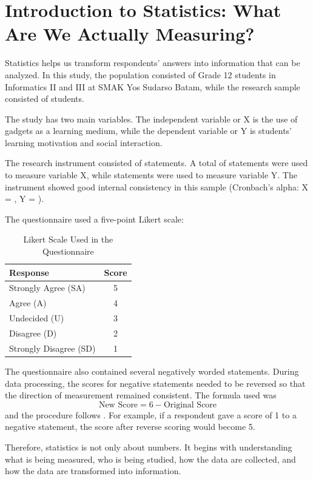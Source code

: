 \section{Introduction to Statistics: What Are We Actually Measuring?}

Statistics helps us transform respondents' answers into information that
can be analyzed. In this study, the population consisted of Grade 12
students in Informatics II and III at SMAK Yos Sudarso Batam, while the
research sample consisted of \resN{} students.

The study has two main variables. The independent variable or X is the use
of gadgets as a learning medium, while the dependent variable or Y is
students' learning motivation and social interaction.

The research instrument consisted of \resNItems{} statements. A total of
\resNXItems{} statements were used to measure variable X, while
\resNYItems{} statements were used to measure variable Y. The instrument
showed good internal consistency in this sample (Cronbach's alpha:
X = \resAlphaX, Y = \resAlphaY).

The questionnaire used a five-point Likert scale:

\begin{table}[htbp]
  \centering
  \singlespacing
  \caption{Likert Scale Used in the Questionnaire}
  \label{tab:likert}
  \begin{tabular}{lc}
    \toprule
    Response & Score \\
    \midrule
    Strongly Agree (SA) & 5 \\
    Agree (A) & 4 \\
    Undecided (U) & 3 \\
    Disagree (D) & 2 \\
    Strongly Disagree (SD) & 1 \\
    \bottomrule
  \end{tabular}
\end{table}

The questionnaire also contained several negatively worded statements.
During data processing, the scores for negative statements needed to be
reversed so that the direction of measurement remained consistent. The
formula used was
\[
\text{New Score} = 6 - \text{Original Score}
\]
and the procedure follows \parencite{field2018}. For example, if a
respondent gave a score of 1 to a negative statement, the score after
reverse scoring would become 5.

Therefore, statistics is not only about numbers. It begins with
understanding what is being measured, who is being studied, how the data
are collected, and how the data are transformed into information.

